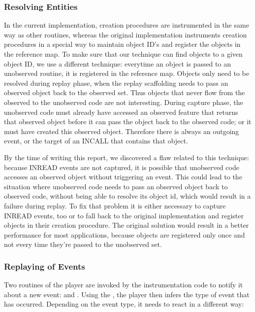 \subsubsection {Resolving Entities}
\label{lbl:entity_resolving}
In the current implementation, creation procedures are instrumented in the same way as other routines, whereas the original implementation instruments creation procedures in a special way to maintain object ID's and register the objects in the reference map. To make sure that our technique can find objects to a given object ID, we use a different technique: everytime an object is passed to an unobserved routine, it is registered in the reference map. Objects only need to be resolved during replay phase, when the replay scaffolding needs to pass an observed object back to the observed set. Thus objects that never flow from the observed to the unobserved code are not interesting. During capture phase, the unobserved code must already have accessed an observed feature that returns that observed object before it can pass the object back to the observed code; or it must have created this observed object.
Therefore there is always an outgoing event, or the target of an INCALL that contains that object.

By the time of writing this report, we discovered a flaw related to this technique: because INREAD events are not captured, it is possible that unobserved code accesses an observed object without triggering an event. This could lead to the situation where unobserved code needs to pass an observed object back to observed code, without being able to resolve its object id, which would result in a failure during replay. To fix that problem it is either necessary to capture INREAD events, too or to fall back to the original implementation and register objects in their creation procedure. The original solution would result in a better performance for most applications, because objects are registered only once and not every time they're passed to the unobserved set.


\subsubsection{Replaying of Events}
Two routines of the player are invoked by the instrumentation code to notify it about a new event:  and . Using the , the player then infers the type of event that has occurred. Depending on the event type, it needs to react in a different way:

